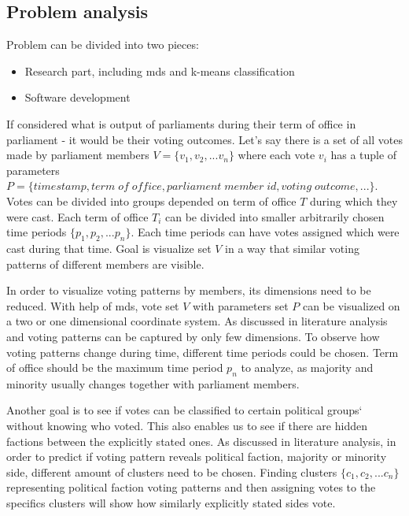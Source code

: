 \documentclass[a4paper,12pt]{article}
\begin{document}
	\clearpage
	 
 	 
 	\subsection{Problem analysis}
 	
 	Problem can be divided into two pieces:
 	\begin{itemize}
 		\item Research part, including \gls{mds} and \gls{k-means} classification
 		\item Software development
 	\end{itemize}
 	
 	If considered what is output of parliaments during their term of office in parliament - it would be their voting outcomes. Let's say there is a set of all votes made by parliament members $V = \{v_1, v_2, ... v_n\}$ where each vote $v_i$ has a tuple of parameters $P = \{timestamp, term\; of\; office, parliament\;member\;id, voting\;outcome,...\}$. Votes can be divided into groups depended on term of office $T$ during which they were cast. Each term of office $T_i$ can be divided into smaller arbitrarily chosen time periods $\{p_1, p_2, ...p_n\}$. Each time periods can have votes assigned which were cast during that time. Goal is visualize set $V$ in a way that similar voting patterns of different members are visible. 
 	
 	In order to visualize voting patterns by members, its dimensions need to be reduced. With help of \acrfull{mds}, vote set $V$ with parameters set $P$ can be visualized on a two or one dimensional coordinate system. As discussed in literature analysis and \cite{poole_2005} voting patterns can be captured by only few dimensions. To observe how voting patterns change during time, different time periods could be chosen. Term of office should be the maximum time period $p_n$ to analyze, as majority and minority usually changes together with parliament members.
 	
 	Another goal is to see if votes can be classified to certain political groups` without knowing who voted. This also enables us to see if there are hidden factions between the explicitly stated ones. As discussed in literature analysis, in order to predict if voting pattern reveals political faction, majority or minority side, different amount of clusters need to be chosen. Finding clusters $\{c_1, c_2,...c_n\}$ representing political faction voting patterns and then assigning votes to the specifics clusters will show how similarly explicitly stated sides vote. 
 
\end{document}

